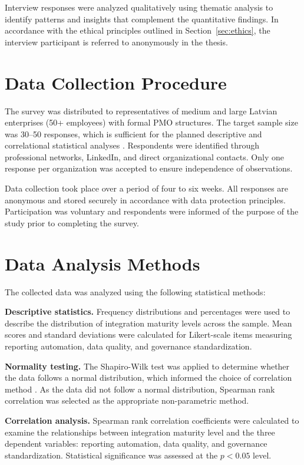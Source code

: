 Interview responses were analyzed qualitatively using thematic analysis to
identify patterns and insights that complement the quantitative findings.
In accordance with the ethical principles outlined in Section~\ref{sec:ethics},
the interview participant is referred to anonymously in the thesis.

\section{Data Collection Procedure}
\label{sec:datacollection}

The survey was distributed to representatives of medium and large Latvian
enterprises (50+ employees) with formal PMO structures. The target sample
size was 30--50 responses, which is sufficient for the planned descriptive
and correlational statistical analyses \cite{field2018}. Respondents were
identified through professional networks, LinkedIn, and direct organizational
contacts. Only one response per organization was accepted to ensure independence
of observations.

Data collection took place over a period of four to six weeks. All responses
are anonymous and stored securely in accordance with data protection principles.
Participation was voluntary and respondents were informed of the purpose of the
study prior to completing the survey.

\section{Data Analysis Methods}
\label{sec:analysis}

The collected data was analyzed using the following statistical methods:

\textbf{Descriptive statistics.} Frequency distributions and percentages were
used to describe the distribution of integration maturity levels across the
sample. Mean scores and standard deviations were calculated for Likert-scale
items measuring reporting automation, data quality, and governance
standardization.

\textbf{Normality testing.} The Shapiro-Wilk test was applied to determine
whether the data follows a normal distribution, which informed the choice
of correlation method \cite{field2018}. As the data did not follow a normal
distribution, Spearman rank correlation was selected as the appropriate
non-parametric method.

\textbf{Correlation analysis.} Spearman rank correlation coefficients were
calculated to examine the relationships between integration maturity level
and the three dependent variables: reporting automation, data quality, and
governance standardization. Statistical significance was assessed at the
$p < 0.05$ level.

